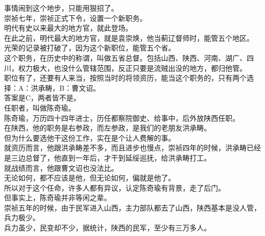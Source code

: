 \begin{multicols}{\theparacolNo}
事情闹到这个地步，只能用狠招了。\\

崇祯七年，崇祯正式下令，设置一个新职务。\\

明代有史以来最大的地方官，就此登场。\\

在此之前，明代最大的地方官，就是袁崇焕，他当蓟辽督师时，能管五个地区。\\

光荣的记录被打破了，因为这个新职位，能管五个省。\\

这个职务，在历史中的称谓，叫做五省总督。包括山西、陕西、河南、湖广、四川，权力极大，也没什么管辖范围，反正只要是流贼出没的地方，都归他管。\\

职位有了，还要有人来当，按照当时的将领资历，能当这个职务的，只有两个选择：A：洪承畴，B：曹文诏。\\

答案是C，两者皆不是。\\

任职者，叫做陈奇瑜。\\

陈奇瑜，万历四十四年进士，历任都察院御史、给事中，后外放陕西任职。\\

在陕西，他的职务是右参政，而左参政，是我们的老朋友洪承畴。\\

但为什么要选他干这份工作，实在是个让人费解的事。\\

就资历而言，他跟洪承畴差不多，而且进步也慢点，崇祯四年的时候，洪承畴已经是三边总督了，他直到一年后，才干到延绥巡抚，给洪承畴打工。\\

就战绩而言，他跟曹文诏也没法比。\\

无论如何，都不应该是他，但无论如何，偏就是他了。\\

所以对于这个任命，许多人都有异议，认定陈奇瑜有背景，走了后门。\\

但事实上，陈奇瑜并非等闲之辈。\\

崇祯五年的时候，由于民军进入山西，主力部队都去了山西，陕西基本是没人管，兵力极少。\\

兵力虽少，民变却不少，据统计，陕西的民军，至少有三万多人。\\


\end{multicols}
